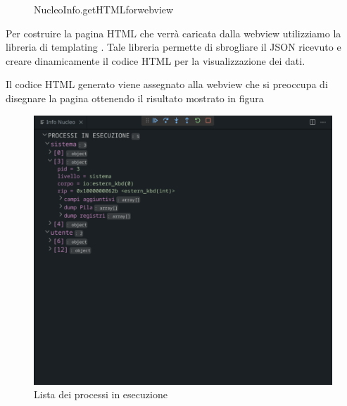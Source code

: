 \begin{figure}[H]
    
    \caption{NucleoInfo.\textunderscore getHTMLforwebview}
\end{figure}

Per costruire la pagina HTML che verrà caricata dalla webview utilizziamo la libreria di templating . Tale libreria permette di sbrogliare il JSON ricevuto e creare dinamicamente il codice HTML per la visualizzazione dei dati. 

Il codice HTML generato viene assegnato alla webview che si preoccupa di disegnare la pagina ottenendo il risultato mostrato in figura
 
\begin{figure}[H]    
    \centering
    \includegraphics[width=0.7\columnwidth]{images/processes.png}
    \caption{Lista dei processi in esecuzione}
\end{figure}